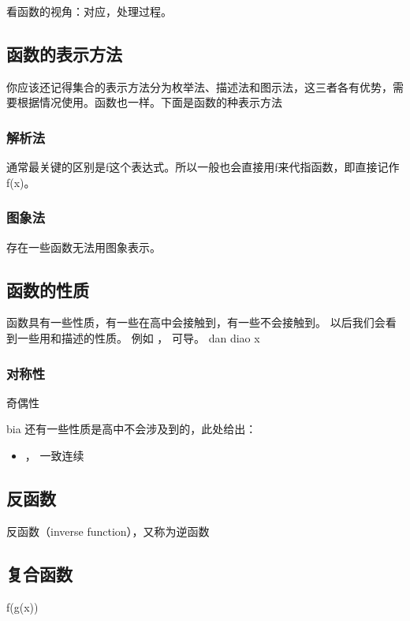 看函数的视角：对应，处理过程。


\subsection{函数的表示方法}

你应该还记得集合的表示方法分为枚举法、描述法和图示法，这三者各有优势，需要根据情况使用。函数也一样。下面是函数的种表示方法

\subsubsection{解析法}

通常最关键的区别是f这个表达式。所以一般也会直接用f来代指函数，即直接记作f(x)。

\subsubsection{图象法}
存在一些函数无法用图象表示。

\subsection{函数的性质}

函数具有一些性质，有一些在高中会接触到，有一些不会接触到。
以后我们会看到一些用和描述的性质。 例如 %
， 可导。
dan diao x

\subsubsection{对称性}
奇偶性

bia
还有一些性质是高中不会涉及到的，此处给出：
\begin{itemize}
\item {}， 一致连续
\end{itemize}

\subsection{反函数}

反函数（inverse function），又称为逆函数

\subsection{复合函数}

f(g(x))

